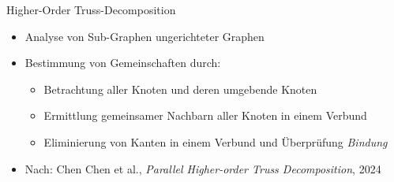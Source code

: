 \begin{frame}{Higher-Order Truss-Decomposition}
    \begin{itemize}
        \item Analyse von Sub-Graphen ungerichteter Graphen
        \item Bestimmung von Gemeinschaften durch:
        \begin{itemize}
            \item Betrachtung aller Knoten und deren umgebende Knoten
            \item Ermittlung gemeinsamer Nachbarn aller Knoten in einem Verbund
            \item Eliminierung von Kanten in einem Verbund und Überprüfung \textit{Bindung}
        \end{itemize}
        \item Nach: Chen Chen et al., \textit{Parallel Higher-order Truss Decomposition}, 2024 \cite{chen2024parallelhigherordertrussdecomposition}
    \end{itemize}
\end{frame}
